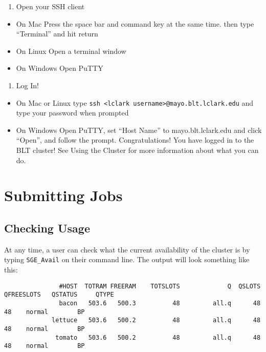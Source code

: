 \documentclass[]{book}
\providecommand{\tightlist}{%
  \setlength{\itemsep}{0pt}\setlength{\parskip}{0pt}}
\theoremstyle{definition}
\theoremstyle{definition}
\theoremstyle{definition}
\theoremstyle{remark}
\begin{document}
\begin{enumerate}
\def\labelenumi{\arabic{enumi}.}
\tightlist
\item
  Open your SSH client
\end{enumerate}

\begin{itemize}
\tightlist
\item
  On Mac Press the space bar and command key at the same time. then type
  ``Terminal'' and hit return
\item
  On Linux Open a terminal window
\item
  On Windows Open PuTTY
\end{itemize}

\begin{enumerate}
\def\labelenumi{\arabic{enumi}.}
\setcounter{enumi}{1}
\tightlist
\item
  Log In!
\end{enumerate}

\begin{itemize}
\tightlist
\item
  On Mac or Linux type
  \texttt{ssh\ \textless{}lclark\ username\textgreater{}@mayo.blt.lclark.edu}
  and type your password when prompted
\item
  On Windows Open PuTTY, set ``Host Name'' to mayo.blt.lclark.edu and
  click ``Open'', and follow the prompt. Congratulations! You have
  logged in to the BLT cluster! See Using the Cluster for more
  information about what you can do.
\end{itemize}

\chapter{Submitting Jobs}\label{submitting-jobs}

\section{Checking Usage}\label{checking-usage}

At any time, a user can check what the current availability of the
cluster is by typing \texttt{SGE\_Avail} on their command line. The
output will look something like this:

\begin{verbatim}
               #HOST  TOTRAM FREERAM    TOTSLOTS             Q  QSLOTS  QFREESLOTS   QSTATUS     QTYPE
               bacon   503.6   500.3          48         all.q      48          48    normal        BP
             lettuce   503.6   500.2          48         all.q      48          48    normal        BP
              tomato   503.6   500.2          48         all.q      48          48    normal        BP
\end{verbatim}
\end{document}
